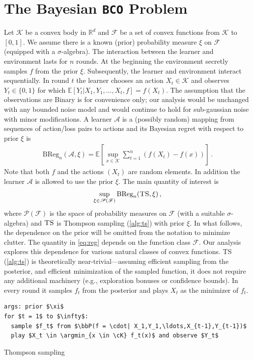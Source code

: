 \documentclass[letter, 12pt]{report}
\newcommand{\R}{\mathbb R}
\newcommand{\argmin}{\operatornamewithlimits{arg\,min}}
\newcommand{\BReg}{\textrm{BReg}}
\newcommand{\E}{\mathbb E}
\newcommand{\cK}{\mathcal K}
\newcommand{\sF}{\mathscr F}
\newcommand{\sA}{\mathscr A}
\newcommand{\sP}{\mathscr P}
\newcommand{\bbP}{\mathbb P}
\newcommand{\1}{\mathbf{1}}
\newcommand{\bco}{\texttt{BCO}\xspace}
\newcommand{\ts}{\textsc{TS}\xspace}
\theoremstyle{plain}
\theoremstyle{definition}
\theoremstyle{remark}
\begin{document}
\section{The Bayesian \bco Problem}
Let $\cK$ be a convex body in $\R^d$ and $\sF$ be a set of convex functions from $\cK$ to $[0,1]$.
We assume there is a known (prior) probability measure $\xi$ on $\sF$ (equipped with a $\sigma$-algebra).
The interaction between the learner and environment
lasts for $n$ rounds. At the beginning the environment secretly samples $f$ from the prior $\xi$.
Subsequently, the learner and environment interact sequentially. In round $t$ the learner chooses an action $X_t \in \cK$ and observes
$Y_t \in \{0, 1\}$ for which $\E[Y_t|X_1,Y_1,\ldots,X_t,f] = f(X_t)$.
The assumption that the observations are Binary is for convenience only; our analysis would be unchanged with any bounded noise model and would continue to hold
for sub-gaussian noise with minor modifications.
A learner $\sA$ is a (possibly random) mapping from sequences of action/loss pairs to actions and its Bayesian regret with respect to prior $\xi$ is
\begin{align*}
    \BReg_n(\sA, \xi) = \E\left[\sup_{x \in \cK} \sum_{t=1}^n \left(f(X_t) - f(x)\right)\right] \,.
\end{align*}
Note that both $f$ and the actions $(X_t)$ are random elements. In addition the learner $\sA$ is allowed to use the prior $\xi$.
The main quantity of interest is
\begin{align}
    \sup_{\xi \in \sP(\sF)} \BReg_n(\ts, \xi)\,,
    \label{eq:reg}
\end{align}
where $\sP(\sF)$ is the space of probability measures on $\sF$ (with a suitable $\sigma$-algebra) and $\ts$ is Thompson sampling (\cref{alg:ts})
with prior $\xi$. In what follows, the dependence on the prior will be omitted from the notation to minimize clutter.
The quantity in \cref{eq:reg} depends on the function class $\sF$. Our analysis explores this dependence for various natural classes of convex functions.
\ts{} (\cref{alg:ts}) is theoretically near-trivial---assuming efficient sampling from the posterior, and efficient minimization of the sampled function, it does not require any additional machinery (e.g., exploration bonuses or confidence bounds).
In every round it samples $f_t$ from the posterior and plays $X_t$ as the minimizer of $f_t$.
\begin{algorithm}[h!]
    \begin{minipage}{12cm}
        \begin{mdframed}
            \begin{lstlisting}
args: prior $\xi$
for $t = 1$ to $\infty$:
  sample $f_t$ from $\bbP(f = \cdot| X_1,Y_1,\ldots,X_{t-1},Y_{t-1})$
  play $X_t \in \argmin_{x \in \cK} f_t(x)$ and observe $Y_t$
\end{lstlisting}
            \caption{Thompson sampling}\label{alg:ts}
        \end{mdframed}
    \end{minipage}
\end{algorithm}
\end{document}
